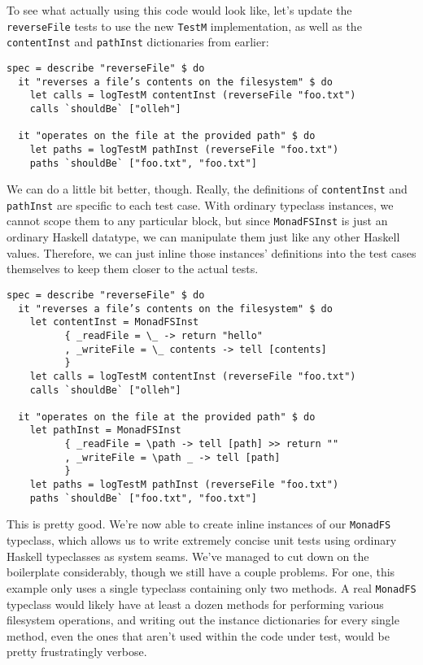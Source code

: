 To see what actually using this code would look like, let's update the
\texttt{reverseFile} tests to use the new \texttt{TestM} implementation,
as well as the \texttt{contentInst} and \texttt{pathInst} dictionaries
from earlier:

\begin{verbatim}
spec = describe "reverseFile" $ do
  it "reverses a file’s contents on the filesystem" $ do
    let calls = logTestM contentInst (reverseFile "foo.txt")
    calls `shouldBe` ["olleh"]

  it "operates on the file at the provided path" $ do
    let paths = logTestM pathInst (reverseFile "foo.txt")
    paths `shouldBe` ["foo.txt", "foo.txt"]
\end{verbatim}
We can do a little bit better, though. Really, the definitions of
\texttt{contentInst} and \texttt{pathInst} are specific to each test
case. With ordinary typeclass instances, we cannot scope them to any
particular block, but since \texttt{MonadFSInst} is just an ordinary
Haskell datatype, we can manipulate them just like any other Haskell
values. Therefore, we can just inline those instances' definitions into
the test cases themselves to keep them closer to the actual tests.

\begin{verbatim}
spec = describe "reverseFile" $ do
  it "reverses a file’s contents on the filesystem" $ do
    let contentInst = MonadFSInst
          { _readFile = \_ -> return "hello"
          , _writeFile = \_ contents -> tell [contents]
          }
    let calls = logTestM contentInst (reverseFile "foo.txt")
    calls `shouldBe` ["olleh"]

  it "operates on the file at the provided path" $ do
    let pathInst = MonadFSInst
          { _readFile = \path -> tell [path] >> return ""
          , _writeFile = \path _ -> tell [path]
          }
    let paths = logTestM pathInst (reverseFile "foo.txt")
    paths `shouldBe` ["foo.txt", "foo.txt"]
\end{verbatim}
This is pretty good. We're now able to create inline instances of our
\texttt{MonadFS} typeclass, which allows us to write extremely concise
unit tests using ordinary Haskell typeclasses as system seams. We've
managed to cut down on the boilerplate considerably, though we still
have a couple problems. For one, this example only uses a single
typeclass containing only two methods. A real \texttt{MonadFS} typeclass
would likely have at least a dozen methods for performing various
filesystem operations, and writing out the instance dictionaries for
every single method, even the ones that aren't used within the code
under test, would be pretty frustratingly verbose.

